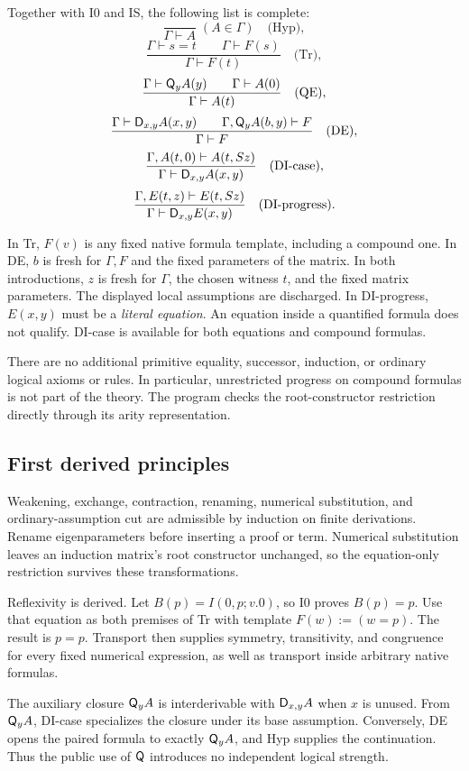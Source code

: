 Together with I0 and IS, the following list is complete:
\[
 \frac{}{\Gamma\vdash A}\;(A\in\Gamma)
 \quad\text{(Hyp)},
\]
\[
 \frac{\Gamma\vdash s=t\qquad\Gamma\vdash F(s)}
      {\Gamma\vdash F(t)}
 \quad\text{(Tr)},
\]
\[
 \frac{\Gamma\vdash\mathsf Q_yA(y)\qquad\Gamma\vdash A(0)}
      {\Gamma\vdash A(t)}
 \quad\text{(QE)},
\]
\[
 \frac{\Gamma\vdash\mathsf D_{x,y}A(x,y)\qquad
       \Gamma,\mathsf Q_yA(b,y)\vdash F}
      {\Gamma\vdash F}
 \quad\text{(DE)},
\]
\[
 \frac{\Gamma,A(t,0)\vdash A(t,Sz)}
      {\Gamma\vdash\mathsf D_{x,y}A(x,y)}
 \quad\text{(DI-case)},
\]
\[
 \frac{\Gamma,E(t,z)\vdash E(t,Sz)}
      {\Gamma\vdash\mathsf D_{x,y}E(x,y)}
 \quad\text{(DI-progress)}.
\]

In Tr, $F(v)$ is any fixed native formula template, including a
compound one. In DE, $b$ is fresh for $\Gamma,F$ and the fixed
parameters of the matrix. In both introductions, $z$ is fresh for
$\Gamma$, the chosen witness $t$, and the fixed matrix parameters.
The displayed local assumptions are discharged. In DI-progress,
$E(x,y)$ must be a \emph{literal equation}. An equation inside a
quantified formula does not qualify. DI-case is available for both
equations and compound formulas.

There are no additional primitive equality, successor, induction, or
ordinary logical axioms or rules. In particular, unrestricted progress
on compound formulas is not part of the theory. The program checks the
root-constructor restriction directly through its arity representation.

\subsection{First derived principles}

Weakening, exchange, contraction, renaming, numerical substitution,
and ordinary-assumption cut are admissible by induction on finite
derivations. Rename eigenparameters before inserting a proof or term.
Numerical substitution leaves an induction matrix's root constructor
unchanged, so the equation-only restriction survives these transformations.

Reflexivity is derived. Let $B(p)=I(0,p;v.0)$, so I0 proves $B(p)=p$.
Use that equation as both premises of Tr with template $F(w):=(w=p)$.
The result is $p=p$. Transport then supplies symmetry, transitivity,
and congruence for every fixed numerical expression, as well as transport
inside arbitrary native formulas.

The auxiliary closure $\mathsf Q_y A$ is interderivable with
$\mathsf D_{x,y}A$ when $x$ is unused. From $\mathsf Q_y A$, DI-case specializes
the closure under its base assumption. Conversely, DE opens the paired
formula to exactly $\mathsf Q_y A$, and Hyp supplies the continuation. Thus
the public use of $\mathsf Q$ introduces no independent logical strength.

